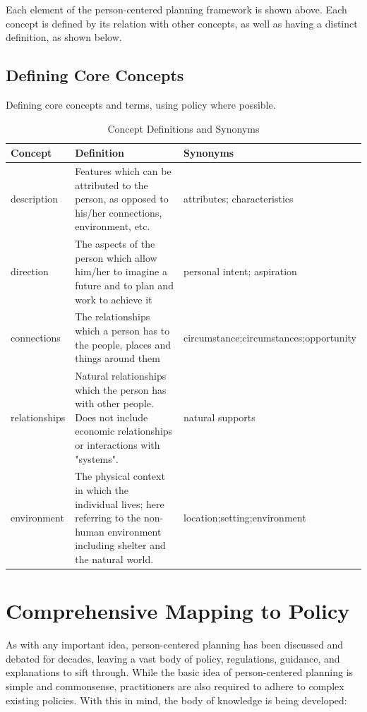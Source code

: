 \documentclass[
]{book}
\begin{document}
Each element of the person-centered planning framework is shown above. Each concept is defined by its relation with other concepts, as well as having a distinct definition, as shown below.

\hypertarget{define}{%
\section{Defining Core Concepts}\label{define}}

Defining core concepts and terms, using policy where possible.

\begin{table}

\caption{\label{tab:unnamed-chunk-9}Concept Definitions and Synonyms}
\centering
\begin{tabular}[t]{l|l|l}
\hline
Concept & Definition & Synonyms\\
\hline
description & Features which can be attributed to the person, as opposed to his/her connections, environment, etc. & attributes; characteristics\\
\hline
direction & The aspects of the person which allow him/her to imagine a future and to plan and work to achieve it & personal intent; aspiration\\
\hline
connections & The relationships which a person has to the people, places and things around them & circumstance;circumstances;opportunity\\
\hline
relationships & Natural relationships which the person has with other people.  Does not include economic relationships or interactions with "systems". & natural supports\\
\hline
environment & The physical context in which the individual lives; here referring to the non-human environment including shelter and the natural world. & location;setting;environment\\
\hline
\end{tabular}
\end{table}

\hypertarget{policy}{%
\chapter{Comprehensive Mapping to Policy}\label{policy}}

As with any important idea, person-centered planning has been discussed and debated for decades, leaving a vast body of policy, regulations, guidance, and explanations to sift through. While the basic idea of person-centered planning is simple and commonsense, practitioners are also required to adhere to complex existing policies. With this in mind, the body of knowledge is being developed:
\end{document}
